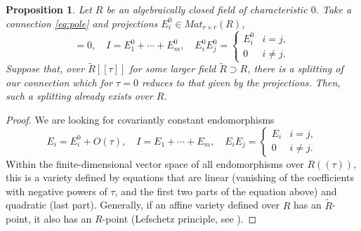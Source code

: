\documentclass[JEP,XML,SOM,Unicode,NoFloatCountersInSection,published]{cedram}
\newcommand{\llbracket}{[\![}
\newcommand{\rrbracket}{]\!]}
\theoremstyle{plain}
\newtheorem{proposition}[theorem]{Proposition}
\theoremstyle{definition}
\begin{document}
\begin{proposition} \label{th:constructible-2}
Let $R$ be an algebraically closed field of characteristic $0$. Take a connection \eqref{eq:pole} and projections $E_i^0 \in \mathit{Mat}_{r \times r}(R)$,
\begin{equation*}
[E_i^0,A^0] = 0, \quad I = E_1^0 + \cdots + E_m^0, \quad E_i^0E_j^0 = \begin{cases}
E_i^0 & i = j, \\ 0 & i \neq j. \end{cases}
\end{equation*}
Suppose that, over $\tilde{R}\llbracket \tau\rrbracket$ for some larger field $\tilde{R} \supset R$, there is a splitting of our connection which for $\tau = 0$ reduces to that given by the projections. Then, such a splitting already exists over $R$.
\end{proposition}

\begin{proof}
We are looking for covariantly constant endomorphisms
\begin{equation*}
E_i = E_i^0 + O(\tau), \quad I = E_1 + \cdots + E_m, \quad E_iE_j = \begin{cases} E_i & i = j, \\ 0 & i \neq j. \end{cases}
\end{equation*}
Within the finite-dimensional vector space of all endomorphisms over $R((\tau))$, this is a variety defined by equations that are linear (vanishing of the coefficients with negative powers of $\tau$, and the first two parts of the equation above) and quadratic (last part). Generally, if an affine variety defined over $R$ has an $\tilde{R}$-point, it also has an $R$-point (Lefschetz principle, see \eg \cite[Cor.\,2.2.10]{marker02}).
\end{proof}

\backmatter


\end{document}
